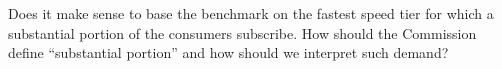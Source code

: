 %

 Does it make sense to base the benchmark on the fastest speed tier for which a substantial portion of the consumers subscribe. How should the Commission define ``substantial portion'' and how should we interpret such demand? 


